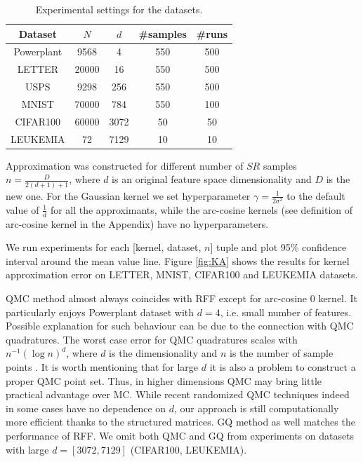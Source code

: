 \begin{table}[h]
    \centering
    \caption{Experimental settings for the datasets.}
    \label{table:experimental_setting}
    \begin{tabular}{ c c c c c }
    \textbf{Dataset} & $N$ & $d$ & \textbf{\#samples} & \textbf{\#runs} \\
    \hline
    Powerplant & 9568 & 4 & 550 & 500 \\
    LETTER & 20000 & 16 & 550 & 500 \\
    USPS & 9298 & 256 & 550 & 500 \\
    MNIST & 70000 & 784 & 550 & 100 \\
    CIFAR100 & 60000 & 3072 & 50 & 50 \\
    LEUKEMIA & 72 & 7129 & 10 & 10 \\
    \hline
    \end{tabular}
\end{table}

Approximation was constructed for different number of $SR$ samples $n = \frac{D}{2(d+1)+1}$,
where $d$ is an original feature space dimensionality and $D$ is the new one. For the Gaussian
kernel we set hyperparameter $\gamma = \frac{1}{2\sigma^2}$ to the default value of
$\frac{1}{d}$ for all the approximants, while the arc-cosine kernels (see definition of
arc-cosine kernel in the Appendix) have no hyperparameters.

We run experiments for each [kernel, dataset, $n$] tuple and plot 95\% confidence interval around the mean value line. Figure \ref{fig:KA} shows the results for kernel approximation error on LETTER, MNIST, CIFAR100 and LEUKEMIA datasets.

QMC method almost always coincides with RFF except for arc-cosine 0 kernel. It particularly enjoys Powerplant dataset with $d=4$, i.e. small number of features. Possible explanation for such behaviour can be due to the connection with QMC quadratures. The worst case error for QMC quadratures scales with $n^{-1}(\log n)^d$, where $d$ is the dimensionality and $n$ is the number of sample points \citep{owen1998latin}. It is worth mentioning that for large $d$ it is also a problem to construct a proper QMC point set. Thus, in higher dimensions QMC may bring little practical advantage over MC. While recent randomized QMC techniques indeed in some cases have no dependence on $d$, our approach is still computationally more efficient thanks to the structured matrices. GQ method as well matches the performance of RFF. We omit both QMC and GQ from experiments on datasets with large $d = [3072, 7129]$ (CIFAR100, LEUKEMIA).


